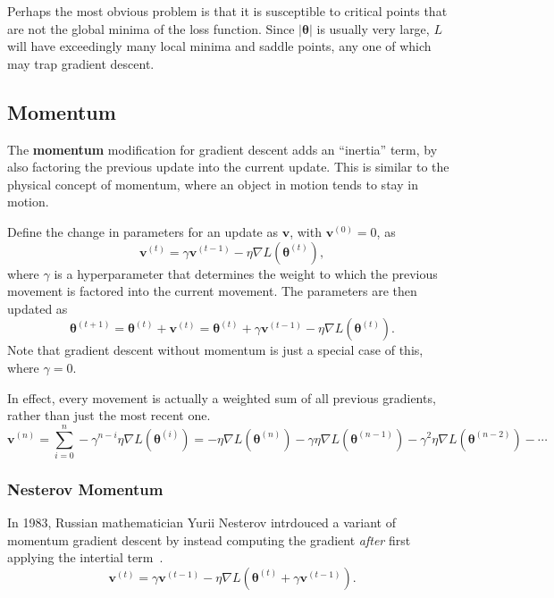 \documentclass[12pt]{report}
\theoremstyle{definition}
\theoremstyle{remark}
\begin{document}
Perhaps the most obvious problem is that it is susceptible to critical points that are not the global minima of the loss function. Since $|\boldsymbol{\theta}|$ is usually very large, $L$ will have exceedingly many local minima and saddle points, any one of which may trap gradient descent.



\subsection{Momentum}
The \textbf{momentum} modification for gradient descent adds an ``inertia'' term, by also factoring the previous update into the current update. This is similar to the physical concept of momentum, where an object in motion tends to stay in motion.

Define the change in parameters for an update as $\mathbf{v}$, with $\mathbf{v}^{(0)} = 0$, as
\begin{equation}
    \mathbf{v}^{(t)} = \gamma \mathbf{v}^{(t-1)} - \eta \nabla L(\boldsymbol{\theta}^{(t)}),
\end{equation}
where $\gamma$ is a hyperparameter that determines the weight to which the previous movement is factored into the current movement. The parameters are then updated as
\begin{equation}
    \boldsymbol{\theta}^{(t+1)} = \boldsymbol{\theta}^{(t)} + \mathbf{v}^{(t)} = \boldsymbol{\theta}^{(t)} + \gamma \mathbf{v}^{(t-1)} - \eta \nabla L(\boldsymbol{\theta}^{(t)}).
\end{equation}
Note that gradient descent without momentum is just a special case of this, where $\gamma = 0$.

In effect, every movement is actually a weighted sum of all previous gradients, rather than just the most recent one.
\begin{equation}
    \mathbf{v}^{(n)} = \sum_{i=0}^{n} -\gamma^{n-i} \eta\nabla L(\boldsymbol{\theta}^{(i)}) = -\eta\nabla L(\boldsymbol{\theta}^{(n)}) - \gamma \eta\nabla L(\boldsymbol{\theta}^{(n-1)}) - \gamma^2 \eta\nabla L(\boldsymbol{\theta}^{(n-2)}) - \cdots
\end{equation}

\subsubsection{Nesterov Momentum}
In 1983, Russian mathematician Yurii Nesterov intrdouced a variant of momentum gradient descent by instead computing the gradient \textit{after} first applying the intertial term~\cite{nesterov_method_1983}.
\begin{equation}
    \mathbf{v}^{(t)} = \gamma \mathbf{v}^{(t-1)} - \eta \nabla L(\boldsymbol{\theta}^{(t)} + \gamma \mathbf{v}^{(t-1)}).
\end{equation}
\end{document}
